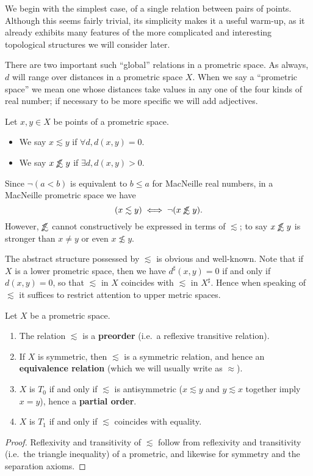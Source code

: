 \documentclass{article}
\def\upp#1{{#1}^{\sharp}}
\def\oapt{\mathrel{\!\not\,\not\lesssim}}
\def\leapx{\lesssim}
\begin{document}
We begin with the simplest case, of a single relation between pairs of points.
Although this seems fairly trivial, its simplicity makes it a useful warm-up, as it already exhibits many features of the more complicated and interesting topological structures we will consider later.

There are two important such ``global'' relations in a prometric space.
As always, $d$ will range over distances in a prometric space $X$.
When we say a ``prometric space'' we mean one whose distances take values in any one of the four kinds of real number; if necessary to be more specific we will add adjectives.

\begin{defn}\label{def:promet-ord}
  Let $x,y\in X$ be points of a prometric space.
  \begin{itemize}
  \item We say $x\leapx y$ if $\forall d, d(x,y)=0$.
  \item We say $x\oapt y$ if $\exists d, d(x,y)>0$.
  \end{itemize}
\end{defn}

Since $\neg(a<b)$ is equivalent to $b\le a$ for MacNeille real numbers, in a MacNeille prometric space we have
\begin{equation}
  (x\leapx y) \iff \neg(x\oapt y).\label{eq:leapx-oapt}
\end{equation}
However, $\oapt$ cannot constructively be expressed in terms of $\leapx$; to say $x\oapt y$ is stronger than $x\neq y$ or even $x\not\leapx y$.

The abstract structure possessed by $\leapx$ is obvious and well-known.
Note that if $X$ is a lower prometric space, then we have $\upp{d}(x,y)=0$ if and only if $d(x,y)=0$, so that $\leapx$ in $X$ coincides with $\leapx$ in $\upp{X}$.
Hence when speaking of $\leapx$ it suffices to restrict attention to upper metric spaces.

\begin{thm}\label{thm:pmet-preord}
  Let $X$ be a prometric space.
  \begin{enumerate}
  \item The relation $\leapx$ is a \textbf{preorder} (i.e.\ a reflexive transitive relation).
  \item If $X$ is symmetric, then $\leapx$ is a symmetric relation, and hence an \textbf{equivalence relation} (which we will usually write as $\approx$).
  \item $X$ is $T_0$ if and only if $\leapx$ is antisymmetric ($x\leapx y$ and $y\leapx x$ together imply $x=y$), hence a \textbf{partial order}.
  \item $X$ is $T_1$ if and only if $\leapx$ coincides with equality.
  \end{enumerate}
\end{thm}
\begin{proof}
  Reflexivity and transitivity of $\leapx$ follow from reflexivity and transitivity (i.e.\ the triangle inequality) of a prometric, and likewise for symmetry and the separation axioms.
\end{proof}
\end{document}
